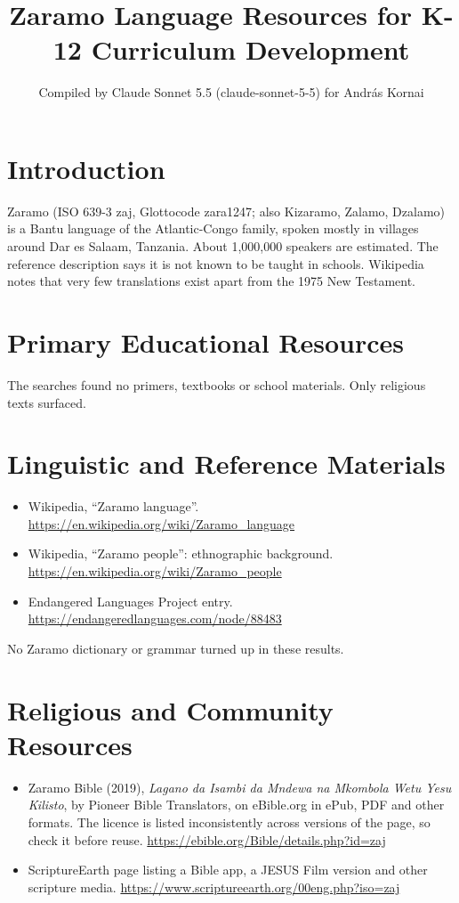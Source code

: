 \documentclass[12pt]{article}
\title{Zaramo Language Resources for K-12 Curriculum Development}
\author{Compiled by Claude Sonnet 5.5 (claude-sonnet-5-5) for Andr\'as Kornai}
\date{}
\begin{document}
\maketitle

\section{Introduction}
Zaramo (ISO 639-3 zaj, Glottocode zara1247; also Kizaramo, Zalamo, Dzalamo) is a Bantu language of the Atlantic-Congo family, spoken mostly in villages around Dar es Salaam, Tanzania. About 1,000,000 speakers are estimated. The reference description says it is not known to be taught in schools. Wikipedia notes that very few translations exist apart from the 1975 New Testament.

\section{Primary Educational Resources}
The searches found no primers, textbooks or school materials. Only religious texts surfaced.

\section{Linguistic and Reference Materials}
\begin{itemize}
\item Wikipedia, ``Zaramo language''. \url{https://en.wikipedia.org/wiki/Zaramo_language}
\item Wikipedia, ``Zaramo people'': ethnographic background. \url{https://en.wikipedia.org/wiki/Zaramo_people}
\item Endangered Languages Project entry. \url{https://endangeredlanguages.com/node/88483}
\end{itemize}
No Zaramo dictionary or grammar turned up in these results.

\section{Religious and Community Resources}
\begin{itemize}
\item Zaramo Bible (2019), \emph{Lagano da Isambi da Mndewa na Mkombola Wetu Yesu Kilisto}, by Pioneer Bible Translators, on eBible.org in ePub, PDF and other formats. The licence is listed inconsistently across versions of the page, so check it before reuse. \url{https://ebible.org/Bible/details.php?id=zaj}
\item ScriptureEarth page listing a Bible app, a JESUS Film version and other scripture media. \url{https://www.scriptureearth.org/00eng.php?iso=zaj}
\end{itemize}
\end{document}
